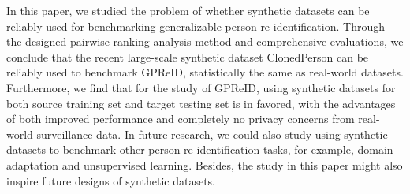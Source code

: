 \documentclass[10pt,twocolumn,letterpaper]{article}
\begin{document}
In this paper, we studied the problem of whether synthetic datasets can be reliably used for benchmarking generalizable person re-identification. Through the designed pairwise ranking analysis method and comprehensive evaluations, we conclude that the recent large-scale synthetic dataset ClonedPerson can be reliably used to benchmark GPReID, statistically the same as real-world datasets. Furthermore, we find that for the study of GPReID, using synthetic datasets for both source training set and target testing set is in favored, with the advantages of both improved performance and completely no privacy concerns from real-world surveillance data. In future research, we could also study using synthetic datasets to benchmark other person re-identification tasks, for example, domain adaptation and unsupervised learning. Besides, the study in this paper might also inspire future designs of synthetic datasets.









{\small


}
\end{document}
